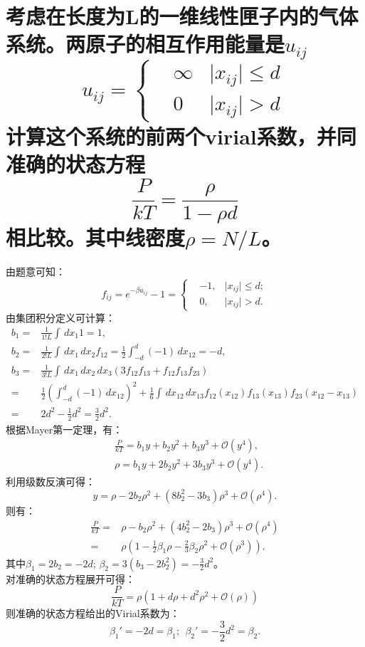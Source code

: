 \documentclass[reqno,a4paper,12pt]{amsart}
\begin{document}
\section{考虑在长度为L的一维线性匣子内的气体系统。两原子的相互作用能量是$u_{ij}$
\[
	u_{ij} = \left\{\begin{aligned}
		&\infty &\vert x_{ij} \vert\leq d \\
		&0 &\vert x_{ij} \vert > d
	\end{aligned}\right.
\]
计算这个系统的前两个virial系数，并同准确的状态方程
\[
	\frac{P}{kT} = \frac{\rho}{1-\rho d}
\]
相比较。其中线密度$\rho = N/L$。
}
\begin{tcolorbox}[breakable, colback = black!5!white, colframe = black]
由题意可知：
\[
	f_{ij} = e^{-\beta u_{ij}} - 1 = \left\{ \begin{aligned}
		&-1, & \vert x_{ij} \vert \leq d; \\
		&0, & \vert x_{ij} \vert > d.
	\end{aligned}\right.
\]
由集团积分定义可计算：
\begin{align*}
	b_1 =& \frac{1}{1!L} \int \,dx_1 1 = 1, \\
	b_2 =& \frac{1}{2!L} \int \,dx_1 \,dx_2 f_{12} = \frac{1}{2}\int_{-d}^d (-1)\,dx_{12} = -d, \\
	b_3 =& \frac{1}{3!L} \int \,dx_1 \,dx_2 \,dx_3 (3f_{12}f_{13} + f_{12}f_{13}f_{23}) \\
	=& \frac{1}{2} \left( \int_{-d}^d (-1)\,dx_{12} \right)^2 + \frac{1}{6} \int \,dx_{12}\,dx_{13} f_{12}(x_{12}) f_{13}(x_{13}) f_{23}(x_{12}-x_{13}) \\
	=& 2d^2 - \frac{1}{2}d^2 = \frac{3}{2}d^2.
\end{align*}
根据Mayer第一定理，有： 
\begin{align*}
	&\frac{P}{kT} = b_1y + b_2y^2 + b_3y^3 + \mathcal{O}(y^4), \\
	&\rho = b_1y + 2b_2y^2 + 3b_3y^3 + \mathcal{O}(y^4).
\end{align*}
利用级数反演可得：
\[
	y = \rho - 2b_2\rho^2 + (8b_2^2 - 3b_3)\rho^3 + \mathcal{O}(\rho^4).
\]
则有：
\begin{align*}
	\frac{P}{kT} =& \rho - b_2\rho^2 + (4b_2^2-2b_3)\rho^3 + \mathcal{O}(\rho^4) \\
	=& \rho \left( 1 - \frac{1}{2}\beta_1\rho - \frac{2}{3}\beta_2\rho^2 + \mathcal{O}(\rho^3) \right).
\end{align*}
其中$\beta_1 = 2b_2 = -2d$; $\beta_2 = 3(b_3-2b_2^2) = -\frac{3}{2}d^2$。 \\
对准确的状态方程展开可得：
\[
	\frac{P}{kT} = \rho\left( 1 + d\rho + d^2\rho^2 + \mathcal{O}(\rho) \right)
\]
则准确的状态方程给出的Virial系数为：
\[
	\beta_1' = -2d = \beta_1; ~~ \beta_2' = -\frac{3}{2}d^2 = \beta_2.
\]
\end{tcolorbox}
\end{document}
